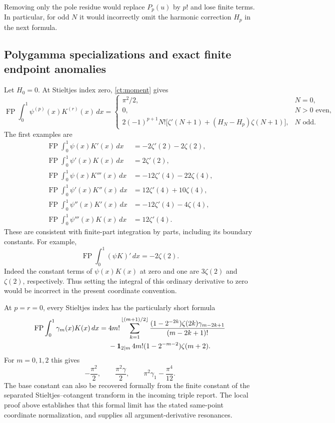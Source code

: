 \documentclass[11pt,a4paper]{article}
\numberwithin{equation}{section}
\theoremstyle{definition}
\theoremstyle{remark}
\begin{document}
Removing only the pole residue would replace $P_p(u)$ by $p!$ and
lose finite terms. In particular, for odd $N$ it would incorrectly
omit the harmonic correction $H_p$ in the next formula.

\subsection{Polygamma specializations and exact finite endpoint anomalies}

Let $H_0=0$. At Stieltjes index zero, \eqref{ct:moment} gives
\begin{equation}\label{ct:zero-index}
 \operatorname{FP}\int_0^1\psi^{(p)}(x)K^{(r)}(x)\,dx
 =\begin{cases}
 \pi^2/2,&N=0,\\
 0,&N>0\text{ even},\\
 2(-1)^{p+1}N!\bigl[\zeta'(N+1)
                +(H_N-H_p)\zeta(N+1)\bigr],&N\text{ odd}.
 \end{cases}
\end{equation}
The first examples are
\begin{align*}
 \operatorname{FP}\int_0^1\psi(x)K'(x)\,dx
   &=-2\zeta'(2)-2\zeta(2),\\
 \operatorname{FP}\int_0^1\psi'(x)K(x)\,dx
   &=2\zeta'(2),\\
 \operatorname{FP}\int_0^1\psi(x)K'''(x)\,dx
   &=-12\zeta'(4)-22\zeta(4),\\
 \operatorname{FP}\int_0^1\psi'(x)K''(x)\,dx
   &=12\zeta'(4)+10\zeta(4),\\
 \operatorname{FP}\int_0^1\psi''(x)K'(x)\,dx
   &=-12\zeta'(4)-4\zeta(4),\\
 \operatorname{FP}\int_0^1\psi'''(x)K(x)\,dx
   &=12\zeta'(4).
\end{align*}
These are consistent with finite-part integration by parts, including
its boundary constants. For example,
\[
 \operatorname{FP}\int_0^1(\psi K)'\,dx=-2\zeta(2).
\]
Indeed the constant terms of $\psi(x)K(x)$ at zero and one are
$3\zeta(2)$ and $\zeta(2)$, respectively. Thus setting the integral
of this ordinary derivative to zero would be incorrect in the present
coordinate convention.

At $p=r=0$, every Stieltjes index has the particularly short formula
\begin{align}
 \operatorname{FP}\int_0^1\gamma_m(x)K(x)\,dx
 ={}&4m!\sum_{k=1}^{\lfloor(m+1)/2\rfloor}
   \frac{(1-2^{-2k})\zeta(2k)\gamma_{m-2k+1}}
                       {(m-2k+1)!}\notag\\
 &-\mathbf1_{2\mid m}\,4m!(1-2^{-m-2})\zeta(m+2).
 \label{ct:all-m-base}
\end{align}
For $m=0,1,2$ this gives
\[
 -\frac{\pi^2}{2},\qquad
 \frac{\pi^2\gamma}{2},\qquad
 \pi^2\gamma_1-\frac{\pi^4}{12}.
\]
The base constant can also be recovered formally from the finite
constant of the separated Stieltjes--cotangent transform in the incoming
triple report. The local proof above establishes that this formal limit
has the stated same-point coordinate normalization, and supplies all
argument-derivative resonances.
\end{document}
